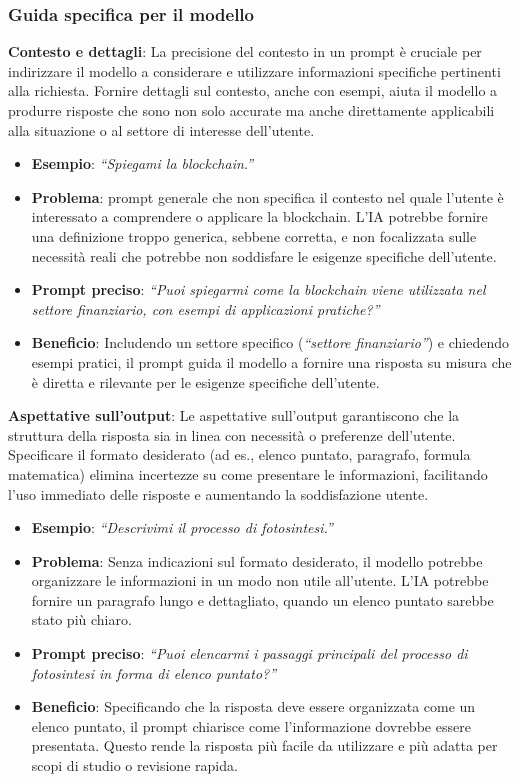         \subsubsection{Guida specifica per il modello}
            \textbf{Contesto e dettagli}: La precisione del contesto in un prompt è cruciale per indirizzare il modello a considerare e utilizzare informazioni specifiche pertinenti alla richiesta. Fornire dettagli sul contesto, anche con esempi, aiuta il modello a produrre risposte che sono non solo accurate ma anche direttamente applicabili alla situazione o al settore di interesse dell'utente.
            \begin{itemize}
                \item \textbf{Esempio}: \textit{``Spiegami la blockchain.''}
                \item \textbf{Problema}: prompt generale che non specifica il contesto nel quale l'utente è interessato a comprendere o applicare la blockchain. L'IA potrebbe fornire una definizione troppo generica, sebbene corretta, e non focalizzata sulle necessità reali che potrebbe non soddisfare le esigenze specifiche dell'utente.
                \item \textbf{Prompt preciso}: \textit{``Puoi spiegarmi come la blockchain viene utilizzata nel settore finanziario, con esempi di applicazioni pratiche?''}
                \item \textbf{Beneficio}: Includendo un settore specifico (\textit{``settore finanziario''}) e chiedendo esempi pratici, il prompt guida il modello a fornire una risposta su misura che è diretta e rilevante per le esigenze specifiche dell'utente.
            \end{itemize}
            \textbf{Aspettative sull'output}: Le aspettative sull'output garantiscono che la struttura della risposta sia in linea con necessità o preferenze dell'utente. Specificare il formato desiderato (ad es., elenco puntato, paragrafo, formula matematica) elimina incertezze su come presentare le informazioni, facilitando l'uso immediato delle risposte e aumentando la soddisfazione utente.
            \begin{itemize}
                \item \textbf{Esempio}: \textit{``Descrivimi il processo di fotosintesi.''}
                \item \textbf{Problema}: Senza indicazioni sul formato desiderato, il modello potrebbe organizzare le informazioni in un modo non utile all'utente. L'IA potrebbe fornire un paragrafo lungo e dettagliato, quando un elenco puntato sarebbe stato più chiaro.
                \item \textbf{Prompt preciso}: \textit{``Puoi elencarmi i passaggi principali del processo di fotosintesi in forma di elenco puntato?''}
                \item \textbf{Beneficio}: Specificando che la risposta deve essere organizzata come un elenco puntato, il prompt chiarisce come l'informazione dovrebbe essere presentata. Questo rende la risposta più facile da utilizzare e più adatta per scopi di studio o revisione rapida.
            \end{itemize}
            
